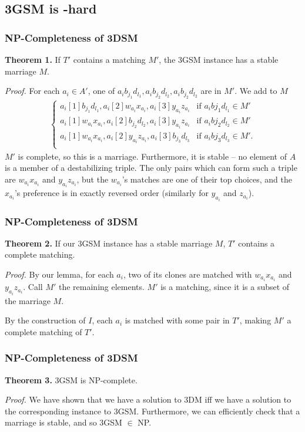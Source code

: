 \documentclass[mathserif,serif]{beamer}
\begin{document}

\subsection{3GSM is \NP-hard}

\begin{frame}
  \frametitle{NP-Completeness of 3DSM}
  \textbf{Theorem 1.} If $T'$ contains a matching $M'$, the 3GSM instance has a stable marriage $M$.

  \textit{Proof.} For each $a_i \in A'$, one of $a_ib_{j_1}d_{l_1}, a_ib_{j_2}d_{l_2}, a_ib_{j_2}d_{l_2}$ are in $M'$. We add to $M$
  \begin{align*}
    \begin{cases}
      a_i[1]b_{j_1}d_{l_1}, a_i[2]w_{a_i}x_{a_i}, a_i[3]y_{a_i}z_{a_i} & \text{if } a_ib{j_1}d_{l_1} \in M' \\
      a_i[1]w_{a_i}x_{a_i}, a_i[2]b_{j_2}d_{l_2}, a_i[3]y_{a_i}z_{a_i} & \text{if } a_ib{j_2}d_{l_2} \in M' \\
      a_i[1]w_{a_i}x_{a_i}, a_i[2]y_{a_i}z_{a_i}, a_i[3]b_{j_3}d_{l_3} & \text{if } a_ib{j_3}d_{l_3} \in M'. \\
    \end{cases}
  \end{align*}
  $M'$ is complete, so this is a marriage. Furthermore, it is stable -- no element of $A$ is a member of a destabilizing triple. The only pairs which can form such a triple are $w_{a_i}x_{a_i}$ and $y_{a_i}z_{a_i}$, but the $w_{a_i}$'s matches are one of their top choices, and the $x_{a_i}$'s preference is in exactly reversed order (similarly for $y_{a_i}$ and $z_{a_i}$).
\end{frame}

\begin{frame}
  \frametitle{NP-Completeness of 3DSM}
  \textbf{Theorem 2.} If our 3GSM instance has a stable marriage $M$, $T'$ contains a complete matching.

  \textit{Proof.} By our lemma, for each $a_i$, two of its clones are matched with $w_{a_i}x_{a_i}$ and $y_{a_i}z_{a_i}$. Call $M'$ the remaining elements. $M'$ is a matching, since it is a subset of the marriage $M$.

  By the construction of $I$, each $a_i$ is matched with some pair in $T'$, making $M'$ a complete matching of $T'$.
\end{frame}

\begin{frame}
  \frametitle{NP-Completeness of 3DSM}
  \textbf{Theorem 3.} 3GSM is NP-complete.

  \textit{Proof.} We have shown that we have a solution to 3DM iff we have a solution to the corresponding instance to 3GSM. Furthermore, we can efficiently check that a marriage is stable, and so 3GSM $\in$ NP.
\end{frame}
\end{document}
